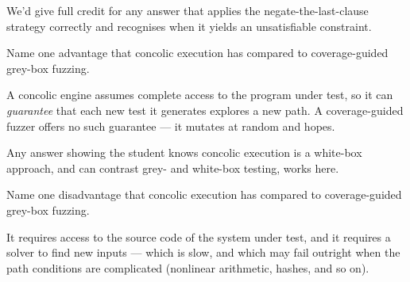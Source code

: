 \documentclass[addpoints, answers]{exam}
\begin{document}
\begin{questions}
\begin{parts}
\begin{solution}
    We'd give full credit for any answer that applies the
    negate-the-last-clause strategy correctly and recognises when it
    yields an unsatisfiable constraint.
  \end{solution}
\end{parts}

\question[1] Name one advantage that concolic execution has compared to
  coverage-guided grey-box fuzzing.
  \begin{solution} %
    A concolic engine assumes complete access to the program under
    test, so it can \emph{guarantee} that each new test it generates
    explores a new path. A coverage-guided fuzzer offers no such
    guarantee --- it mutates at random and hopes.

    Any answer showing the student knows concolic execution is a
    white-box approach, and can contrast grey- and white-box testing,
    works here.
  \end{solution}

\question[1] Name one disadvantage that concolic execution has compared
  to coverage-guided grey-box fuzzing.
  \begin{solution} %
    It requires access to the source code of the system under test, and
    it requires a solver to find new inputs --- which is slow, and
    which may fail outright when the path conditions are complicated
    (nonlinear arithmetic, hashes, and so on).
  \end{solution}

\end{questions}
\end{document}
